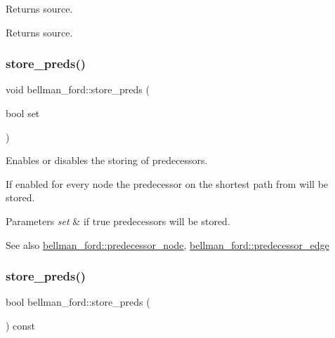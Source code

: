 Returns source. 

\begin{DoxyReturn}{Returns}
source. 
\end{DoxyReturn}
\mbox{\label{classbellman__ford_aac87169a3cf4f95477ce215a0cb7a12b}} 
\subsubsection{\texorpdfstring{store\+\_\+preds()}{store\_preds()}\hspace{0.1cm}{\footnotesize\ttfamily [1/2]}}
{\footnotesize\ttfamily void bellman\+\_\+ford\+::store\+\_\+preds (\begin{DoxyParamCaption}\item[{bool}]{set }\end{DoxyParamCaption})}



Enables or disables the storing of predecessors. 

If enabled for every node the predecessor on the shortest path from will be stored.


\begin{DoxyParams}{Parameters}
{\em set} & if true predecessors will be stored. \\
\hline
\end{DoxyParams}
\begin{DoxySeeAlso}{See also}
\mbox{\hyperlink{classbellman__ford_a403e286ec8cbe3c30a7a729c5041155e}{bellman\+\_\+ford\+::predecessor\+\_\+node}}, \mbox{\hyperlink{classbellman__ford_a39f93b0b1e427cf26059fa6141c6f61c}{bellman\+\_\+ford\+::predecessor\+\_\+edge}} 
\end{DoxySeeAlso}
\mbox{\label{classbellman__ford_a2ded0950bfaca6c3ee65a3617c1ccaa8}} 
\subsubsection{\texorpdfstring{store\+\_\+preds()}{store\_preds()}\hspace{0.1cm}{\footnotesize\ttfamily [2/2]}}
{\footnotesize\ttfamily bool bellman\+\_\+ford\+::store\+\_\+preds (\begin{DoxyParamCaption}{ }\end{DoxyParamCaption}) const\hspace{0.3cm}{\ttfamily [inline]}}



